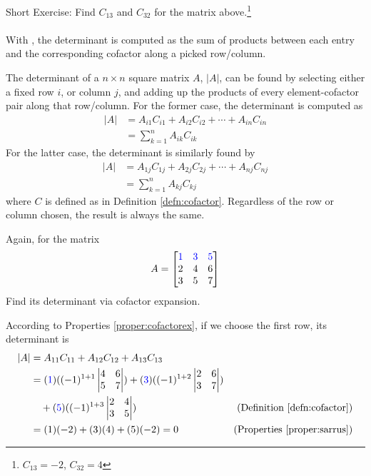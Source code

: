 Short Exercise: Find $C_{13}$ and $C_{32}$ for the matrix above.\footnote{$C_{13} = -2$, $C_{32} = 4$}\\
\\
With , the determinant is computed as the sum of products between each entry and the corresponding cofactor along a picked row/column.
\begin{proper}
\label{proper:cofactorex}
The determinant of a $n \times n$ square matrix $A$, $|A|$, can be found by selecting either a fixed row $i$, or column $j$, and adding up the products of every element-cofactor pair along that row/column. For the former case, the determinant is computed as
\begin{align*}
|A| &= A_{i1}C_{i1} + A_{i2}C_{i2} + \cdots + A_{in}C_{in} \\
&= \sum_{k=1}^{n} A_{ik}C_{ik}
\end{align*}
For the latter case, the determinant is similarly found by
\begin{align*}
|A| &= A_{1j}C_{1j} + A_{2j}C_{2j} + \cdots + A_{nj}C_{nj} \\
&= \sum_{k=1}^{n} A_{kj}C_{kj}
\end{align*}
where $C$ is defined as in Definition \ref{defn:cofactor}. Regardless of the row or column chosen, the result is always the same.
\end{proper}
\begin{exmp}
Again, for the matrix
\begin{align*}
A =
\begin{bmatrix}
\textcolor{blue}{1} & \textcolor{blue}{3} & \textcolor{blue}{5} \\
2 & 4 & 6 \\
3 & 5 & 7 
\end{bmatrix}   
\end{align*}
Find its determinant via cofactor expansion.
\end{exmp}
\begin{solution}
According to Properties \ref{proper:cofactorex}, if we choose the first row, its determinant is
\begin{align*}
|A| &= A_{11}C_{11} + A_{12}C_{12} + A_{13}C_{13} \\
&= 
(\textcolor{blue}{1})((-1)^{1+1}
\begin{vmatrix}
4 & 6 \\
5 & 7
\end{vmatrix})
+
(\textcolor{blue}{3})((-1)^{1+2}
\begin{vmatrix}
2 & 6 \\
3 & 7
\end{vmatrix}) \\
&\quad+ 
(\textcolor{blue}{5})((-1)^{1+3}
\begin{vmatrix}
2 & 4 \\
3 & 5
\end{vmatrix}) & \text{(Definition \ref{defn:cofactor})}\\
&= (1)(-2) + (3)(4) + (5)(-2) = 0 & \text{(Properties \ref{proper:sarrus})} 
\end{align*}
\end{solution}
